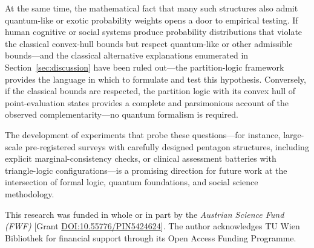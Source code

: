 \documentclass[aps,pra,twocolumn,superscriptaddress,floatfix,longbibliography]{revtex4-2}
\begin{document}
At the same time, the mathematical fact that many such structures
also admit quantum-like or exotic probability weights opens a door to
empirical testing. If human cognitive or social systems produce
probability distributions that violate the classical convex-hull
bounds but respect quantum-like or other admissible bounds---and the
classical alternative explanations enumerated in
Section~\ref{sec:discussion} have been ruled out---the
partition-logic framework provides the language in which to formulate
and test this hypothesis. Conversely, if the classical bounds are
respected, the partition logic with its convex hull of
point-evaluation states provides a complete and parsimonious account
of the observed complementarity---no quantum formalism is required.

The development of experiments that probe these questions---for
instance, large-scale pre-registered surveys with carefully designed
pentagon structures, including explicit marginal-consistency checks,
or clinical assessment batteries with triangle-logic
configurations---is a promising direction for future work at the
intersection of formal logic, quantum foundations, and social
science methodology.

\begin{acknowledgments}
This research was funded in whole or in part by the \textit{Austrian Science Fund (FWF)} [Grant \href{https://doi.org/10.55776/PIN5424624}{DOI:10.55776/PIN5424624}].
The author acknowledges TU Wien Bibliothek for financial support through its Open Access Funding Programme.
\end{acknowledgments}


\end{document}
